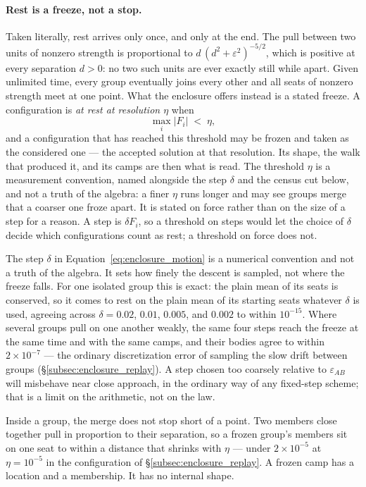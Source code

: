\documentclass[12pt, a4paper]{article}
\begin{document}
\paragraph{Rest is a freeze, not a stop.}
Taken literally, rest arrives only once, and only at the end. The
pull between two units of nonzero strength is proportional to
$d\,(d^2+\varepsilon^2)^{-5/2}$, which is positive at every
separation $d>0$: no two such units are ever exactly still while
apart. Given unlimited time, every group eventually joins every
other and all seats of nonzero strength meet at one point. What the enclosure offers
instead is a stated freeze. A configuration is \emph{at rest at
resolution $\eta$} when
\begin{equation}
    \max_i \lvert F_i \rvert \;<\; \eta,
    \label{eq:enclosure_freeze}
\end{equation}
and a configuration that has reached this threshold may be frozen and
taken as the considered one --- the accepted solution at that
resolution. Its shape, the walk that produced it, and its camps are
then what is read. The threshold $\eta$ is a measurement convention,
named alongside the step $\delta$ and the census cut below, and not a
truth of the algebra: a finer $\eta$ runs longer and may see groups
merge that a coarser one froze apart. It is stated on force rather
than on the size of a step for a reason. A step is $\delta F_i$, so a
threshold on steps would let the choice of $\delta$ decide which
configurations count as rest; a threshold on force does not.

The step $\delta$ in Equation~\eqref{eq:enclosure_motion} is a
numerical convention and not a truth of the algebra. It sets how
finely the descent is sampled, not where the freeze falls. For one
isolated group this is exact: the plain mean of its seats is
conserved, so it comes to rest on the plain mean of its starting
seats whatever $\delta$ is used, agreeing across
$\delta = 0.02$, $0.01$, $0.005$, and $0.002$ to within
$10^{-15}$. Where several groups pull on one another weakly, the
same four steps reach the freeze at the same time and with the same
camps, and their bodies agree to within $2\times10^{-7}$ --- the
ordinary discretization error of sampling the slow drift between
groups (\S\ref{subsec:enclosure_replay}). A step chosen too coarsely
relative to $\varepsilon_{AB}$ will misbehave near close approach,
in the ordinary way of any fixed-step scheme; that is a limit on the
arithmetic, not on the law.

Inside a group, the merge does not stop short of a point. Two
members close together pull in proportion to their separation, so a
frozen group's members sit on one seat to within a distance that
shrinks with $\eta$ --- under $2\times10^{-5}$ at $\eta=10^{-5}$ in
the configuration of \S\ref{subsec:enclosure_replay}. A frozen camp
has a location and a membership. It has no internal shape.
\end{document}
